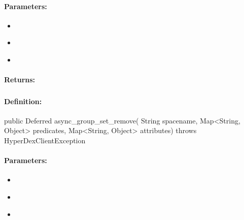 \paragraph{Parameters:}
\begin{itemize}[noitemsep]
\item {}\\

\item {}\\

\item {}\\

\end{itemize}

\paragraph{Returns:}


\pagebreak
\subsubsection{}
\label{api:java:async_group_set_remove}


\paragraph{Definition:}
\begin{javacode}
public Deferred async_group_set_remove(
        String spacename,
        Map<String, Object> predicates,
        Map<String, Object> attributes) throws HyperDexClientException
\end{javacode}

\paragraph{Parameters:}
\begin{itemize}[noitemsep]
\item {}\\

\item {}\\

\item {}\\

\end{itemize}

